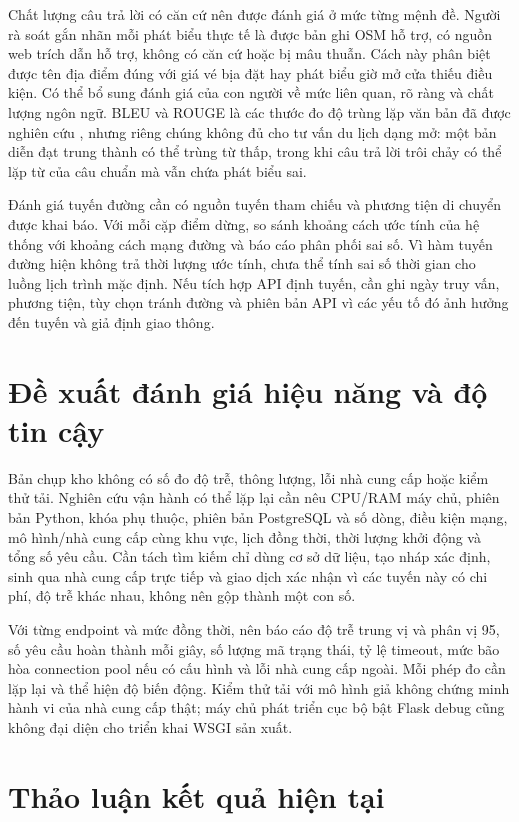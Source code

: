 Chất lượng câu trả lời có căn cứ nên được đánh giá ở mức từng mệnh đề. Người rà soát gắn nhãn mỗi phát biểu thực tế là được bản ghi OSM hỗ trợ, có nguồn web trích dẫn hỗ trợ, không có căn cứ hoặc bị mâu thuẫn. Cách này phân biệt được tên địa điểm đúng với giá vé bịa đặt hay phát biểu giờ mở cửa thiếu điều kiện. Có thể bổ sung đánh giá của con người về mức liên quan, rõ ràng và chất lượng ngôn ngữ. BLEU và ROUGE là các thước đo độ trùng lặp văn bản đã được nghiên cứu \cite{papineni2002bleu,lin2004rouge}, nhưng riêng chúng không đủ cho tư vấn du lịch dạng mở: một bản diễn đạt trung thành có thể trùng từ thấp, trong khi câu trả lời trôi chảy có thể lặp từ của câu chuẩn mà vẫn chứa phát biểu sai.

Đánh giá tuyến đường cần có nguồn tuyến tham chiếu và phương tiện di chuyển được khai báo. Với mỗi cặp điểm dừng, so sánh khoảng cách ước tính của hệ thống với khoảng cách mạng đường và báo cáo phân phối sai số. Vì hàm tuyến đường hiện không trả thời lượng ước tính, chưa thể tính sai số thời gian cho luồng lịch trình mặc định. Nếu tích hợp API định tuyến, cần ghi ngày truy vấn, phương tiện, tùy chọn tránh đường và phiên bản API vì các yếu tố đó ảnh hưởng đến tuyến và giả định giao thông.

\section{Đề xuất đánh giá hiệu năng và độ tin cậy}

Bản chụp kho không có số đo độ trễ, thông lượng, lỗi nhà cung cấp hoặc kiểm thử tải. Nghiên cứu vận hành có thể lặp lại cần nêu CPU/RAM máy chủ, phiên bản Python, khóa phụ thuộc, phiên bản PostgreSQL và số dòng, điều kiện mạng, mô hình/nhà cung cấp cùng khu vực, lịch đồng thời, thời lượng khởi động và tổng số yêu cầu. Cần tách tìm kiếm chỉ dùng cơ sở dữ liệu, tạo nháp xác định, sinh qua nhà cung cấp trực tiếp và giao dịch xác nhận vì các tuyến này có chi phí, độ trễ khác nhau, không nên gộp thành một con số.

Với từng endpoint và mức đồng thời, nên báo cáo độ trễ trung vị và phân vị 95, số yêu cầu hoàn thành mỗi giây, số lượng mã trạng thái, tỷ lệ timeout, mức bão hòa connection pool nếu có cấu hình và lỗi nhà cung cấp ngoài. Mỗi phép đo cần lặp lại và thể hiện độ biến động. Kiểm thử tải với mô hình giả không chứng minh hành vi của nhà cung cấp thật; máy chủ phát triển cục bộ bật Flask debug cũng không đại diện cho triển khai WSGI sản xuất.

\section{Thảo luận kết quả hiện tại}

